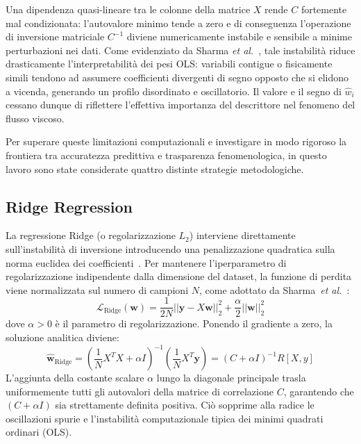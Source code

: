 \documentclass[../main.tex]{subfiles}
\begin{document}
	Una dipendenza quasi-lineare tra le colonne della matrice $X$ rende $C$ fortemente mal condizionata: l'autovalore minimo tende a zero e di conseguenza l'operazione di inversione matriciale $C^{-1}$ diviene numericamente instabile e sensibile a minime perturbazioni nei dati.
	Come evidenziato da Sharma \textit{et al.}~\cite{sharmaInterpretabilityLinearRegression2026}, tale instabilità riduce drasticamente l'interpretabilità dei pesi OLS: variabili contigue o fisicamente simili tendono ad assumere coefficienti divergenti di segno opposto che si elidono a vicenda, generando un profilo disordinato e oscillatorio. Il valore e il segno di $\hat{w}_i$ cessano dunque di riflettere l'effettiva importanza del descrittore nel fenomeno del flusso viscoso. 
	
	Per superare queste limitazioni computazionali e investigare in modo rigoroso la frontiera tra accuratezza predittiva e trasparenza fenomenologica, in questo lavoro sono state considerate quattro distinte strategie metodologiche.
	
	\subsection{Ridge Regression}
	\label{sec:ridge_intro}
	
	La regressione Ridge (o regolarizzazione $L_2$) interviene direttamente sull'instabilità di inversione introducendo una penalizzazione quadratica sulla norma euclidea dei coefficienti~\cite{hoerlRidgeRegressionBiased1970}. Per mantenere l'iperparametro di regolarizzazione indipendente dalla dimensione del dataset, la funzione di perdita viene normalizzata sul numero di campioni $N$, come adottato da Sharma~\textit{et al.}~\cite{sharmaInterpretabilityLinearRegression2026}:
	\begin{equation}
		\mathcal{L}_{\text{Ridge}}(\mathbf{w}) = \frac{1}{2N} ||\mathbf{y} - X\mathbf{w}||_2^2 + \frac{\alpha}{2} ||\mathbf{w}||_2^2
		\label{eq:ridge_loss}
	\end{equation}
	dove $\alpha > 0$ è il parametro di regolarizzazione. Ponendo il gradiente a zero, la soluzione analitica diviene:
	\begin{equation}
		\hat{\mathbf{w}}_{\text{Ridge}} = \left(\frac{1}{N}X^T X + \alpha I\right)^{-1} \left(\frac{1}{N}X^T \mathbf{y}\right) = (C + \alpha I)^{-1} R[X, y]
		\label{eq:ridge_solution}
	\end{equation}
	L'aggiunta della costante scalare $\alpha$ lungo la diagonale principale trasla uniformemente tutti gli autovalori della matrice di correlazione $C$, garantendo che $(C + \alpha I)$ sia strettamente definita positiva. Ciò sopprime alla radice le oscillazioni spurie e l'instabilità computazionale tipica dei minimi quadrati ordinari (OLS).
	
\end{document}
